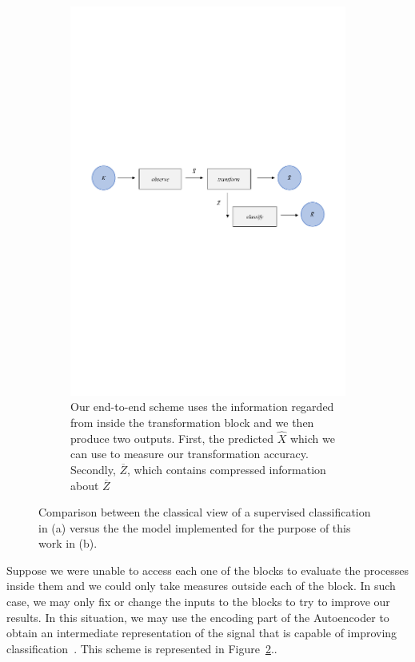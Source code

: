 \begin{figure}[H]
	\begin{subfigure}{1\textwidth} 
		\centering
		\includegraphics[width=16.5cm]{Figuras_tfg/Figura1_1_tfg}
		\caption{Our end-to-end scheme uses the information regarded from inside the transformation block and we then produce two outputs. First, the predicted $\hat{X}$ which we can use to measure our transformation accuracy. Secondly, $\overline{Z}$, which contains compressed information about $\overline{Z}$}
		\label{fig:fig1a} 
	\end{subfigure}%
	\caption{Comparison between the classical view of a supervised classification in (a) versus the the model implemented for the purpose of this work in (b).}
	\label{fig:fig1}
\end{figure}

Suppose we were unable to access each one of the blocks to evaluate the processes inside them and we could only take measures outside each of the block. In such case, we may only fix or change the  inputs to the blocks to try to improve our results.
%
In this situation, we may use the encoding part of the Autoencoder to obtain an intermediate representation of the signal that is capable of improving classification~\cite{Yu_2019}. This scheme is represented in  Figure~\ref{fig:fig1}.. 

